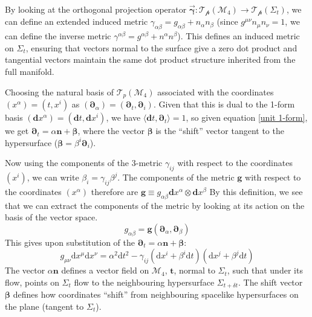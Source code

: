 \documentclass[aps,prd,reprint,preprintnumbers,showpacs,floatfix,nofootinbib,superscript address]{revtex4-2}
\begin{document}
By looking at the orthogonal projection operator $\Vec{\mathbf{\gamma}} : \mathcal{T_p}(\mathcal{M}_4) \rightarrow \mathcal{T_p}(\Sigma_t)$, we can define an extended induced metric $\gamma_{\alpha\beta} = g_{\alpha\beta} + n_\alpha n_\beta$ (since $g^{\mu\nu} n_\mu n_\nu = 1$, we can define the inverse metric $\gamma^{\alpha\beta} = g^{\alpha\beta} + n^\alpha n^\beta$). This defines an induced metric on $\Sigma_t$, ensuring that vectors normal to the surface give a zero dot product and tangential vectors maintain the same dot product structure inherited from the full manifold. 

Choosing the natural basis of $\mathcal{T}_p(\mathcal{M}_4)$ associated with the coordinates $(x^\alpha) =(t,x^i)$ as $(\bm{\partial}_\alpha)=(\bm{\partial}_t, \bm{\partial}_i)$. Given that this is dual to the 1-form basis $(\textbf{d}x^\alpha) = (\textbf{d}t, \textbf{d}x^i)$, we have $\langle \textbf{d}t, \bm{\partial}_t \rangle = 1$, so given equation \cref{unit 1-form}, we get $\bm{\partial}_t = \alpha \bm{n} + \bm{\beta}$, where the vector $\bm{\beta}$ is the ``shift'' vector tangent to the hypersurface ($\bm{\beta} = \beta^i \boldsymbol{\partial}_i$). 

Now using the components of the 3-metric $\gamma_{i j}$ with respect to the coordinates $(x^i)$, we can write $\beta_i = \gamma_{ij}\beta^j$. The components of the metric $\bm{g}$ with respect to the coordinates $(x^\alpha)$ therefore are $\bm{g} \equiv g_{\alpha \beta} \textbf{d}x^\alpha \otimes \textbf{d}x^\beta$
By this definition, we see that we can extract the components of the metric by looking at its action on the basis of the vector space. 
\begin{equation}
    g_{\alpha\beta} = \bm{g} (\bm{\partial}_\alpha, \bm{\partial}_\beta)
\end{equation}
This gives upon substitution of the $\bm{\partial}_t = \alpha \bm{n} + \bm{\beta}$:
\begin{equation} \label{General split Metric}
    g_{\mu \nu} \text{d}x^\mu\text{d}x^\nu = \alpha^2 \text{d}t^2 - \gamma_{ij}(\text{d}x^i + \beta^i \text{d}t)(\text{d}x^j + \beta^j \text{d}t)
\end{equation}
The vector $\alpha \bm{n}$ defines a vector field on $\mathcal{M}_4$, $\bm{t}$, normal to $\Sigma_t$, such that under its flow, points on $\Sigma_t$ flow to the neighbouring hypersurface $\Sigma_{t+\delta t}$. The shift vector $\bm{\beta}$ defines how coordinates ``shift'' from neighbouring spacelike hypersurfaces on the plane (tangent to $\Sigma_t$). 
\end{document}
